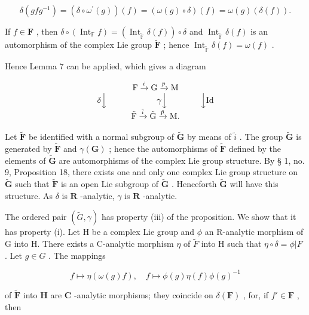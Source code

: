 \[
\delta (g f g ^ {- 1}) = (\delta \circ \omega^ {\prime} (g)) (f) = (\omega (g) \circ \delta) (f) = \omega (g) (\delta (f)).
\]

If \(f \in \mathbf{F}\) , then \(\delta \circ (\operatorname{Int}_{\mathbb{F}} f) = (\operatorname{Int}_{\tilde{\mathbb{F}}} \delta(f)) \circ \delta\) and \(\operatorname{Int}_{\tilde{\mathbb{F}}} \delta(f)\) is an automorphism of the complex Lie group \(\tilde{\mathbf{F}}\) ; hence \(\operatorname{Int}_{\tilde{\mathbb{F}}} \delta(f) = \omega(f)\) .

Hence Lemma 7 can be applied, which gives a diagram

\[
\begin{array}{c} \mathrm{F} \xrightarrow {i} \mathrm{G} \xrightarrow {p} \mathrm{M} \\ \delta \Big \downarrow \qquad \qquad \qquad \gamma \Big \downarrow \qquad \qquad \Big \downarrow \mathrm{Id} \\ \tilde {\mathrm{F}} \xrightarrow {\tilde {i}} \tilde {\mathrm{G}} \xrightarrow {\tilde {p}} \mathrm{M}. \end{array}
\]

Let \(\tilde{\mathbf{F}}\) be identified with a normal subgroup of \(\tilde{\mathbf{G}}\) by means of \(\tilde{i}\) . The group \(\tilde{\mathbf{G}}\) is generated by \(\tilde{\mathbf{F}}\) and \(\gamma (\mathbf{G})\) ; hence the automorphisms of \(\tilde{\mathbf{F}}\) defined by the elements of \(\tilde{\mathbf{G}}\) are automorphisms of the complex Lie group structure. By § 1, no. 9, Proposition 18, there exists one and only one complex Lie group structure on \(\tilde{\mathbf{G}}\) such that \(\tilde{\mathbf{F}}\) is an open Lie subgroup of \(\tilde{\mathbf{G}}\) . Henceforth \(\tilde{\mathbf{G}}\) will have this structure. As \(\delta\) is \(\mathbf{R}\) -analytic, \(\gamma\) is \(\mathbf{R}\) -analytic.

The ordered pair \((\tilde{G},\gamma)\) has property (iii) of the proposition. We show that it has property (i). Let H be a complex Lie group and \(\phi\) an R-analytic morphism of G into H. There exists a C-analytic morphism \(\eta\) of \(\tilde{F}\) into H such that \(\eta \circ \delta = \phi |F\) . Let \(g\in G\) . The mappings

\[
f \mapsto \eta (\omega (g) f), \quad f \mapsto \phi (g) \eta (f) \phi (g) ^ {- 1}
\]

of \(\tilde{\mathbf{F}}\) into \(\mathbf{H}\) are \(\mathbf{C}\) -analytic morphisms; they coincide on \(\delta(\mathbf{F})\) , for, if \(f' \in \mathbf{F}\) , then

